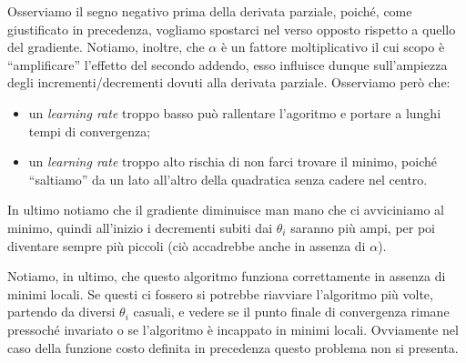 Osserviamo il segno negativo prima della derivata parziale, poiché, come giustificato in precedenza, vogliamo spostarci nel verso opposto rispetto a quello del gradiente.
Notiamo, inoltre, che $\alpha$ è un fattore moltiplicativo il cui scopo è ``amplificare'' l'effetto del secondo addendo, esso influisce dunque sull'ampiezza degli incrementi/decrementi dovuti alla derivata parziale. Osserviamo però che:
\begin{itemize}
  \item un \emph{learning rate} troppo basso può rallentare l'agoritmo e portare a lunghi tempi di convergenza;
  \item un \emph{learning rate} troppo alto rischia di non farci trovare il minimo, poiché ``saltiamo'' da un lato all'altro della quadratica senza cadere nel centro.
\end{itemize}
In ultimo notiamo che il gradiente diminuisce man mano che ci avviciniamo al minimo, quindi all'inizio i decrementi subiti dai $\theta_i$ saranno più ampi, per poi diventare sempre più piccoli (ciò accadrebbe anche in assenza di $\alpha$).

Notiamo, in ultimo, che questo algoritmo funziona correttamente in assenza di minimi locali. Se questi ci fossero si potrebbe riavviare l'algoritmo più volte, partendo da diversi $\theta_i$ casuali, e vedere se il punto finale di convergenza rimane pressoché invariato o se l'algoritmo è incappato in minimi locali. Ovviamente nel caso della funzione costo definita in precedenza questo problema non si presenta.

